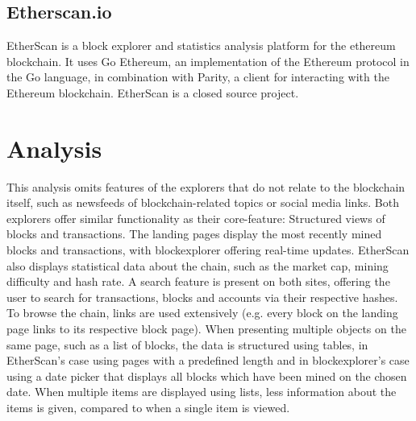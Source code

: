 \subsection{Etherscan.io}
EtherScan is a block explorer and statistics analysis platform for the ethereum blockchain. It uses Go Ethereum, an implementation of the Ethereum protocol in the Go language, in combination with Parity, a client for interacting with the Ethereum blockchain. EtherScan is a closed source project.

\section{Analysis}
This analysis omits features of the explorers that do not relate to the blockchain itself, such as newsfeeds of blockchain-related topics or social media links. Both explorers offer similar functionality as their core-feature: Structured views of blocks and transactions. The landing pages display the most recently mined blocks and transactions, with blockexplorer offering real-time updates. EtherScan also displays statistical data about the chain, such as the market cap, mining difficulty and hash rate. A search feature is present on both sites, offering the user to search for transactions, blocks and accounts via their respective hashes. To browse the chain, links are used extensively (e.g. every block on the landing page links to its respective block page). When presenting multiple objects on the same page, such as a list of blocks, the data is structured using tables, in EtherScan's case using pages with a predefined length and in blockexplorer's case using a date picker that displays all blocks which have been mined on the chosen date. When multiple items are displayed using lists, less information about the items is given, compared to when a single item is viewed. 